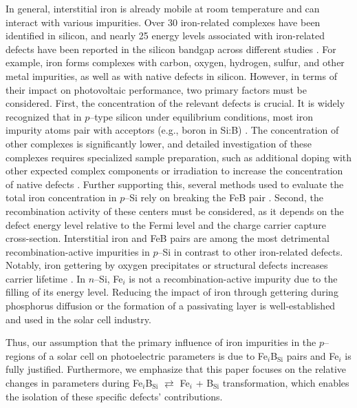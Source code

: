 \documentclass[a4paper,fleqn]{cas-sc}
\begin{document}
In general, interstitial iron is already mobile at room temperature and can interact with various impurities. 
Over 30 iron-related complexes have been identified in silicon, 
and nearly 25 energy levels associated with iron-related defects have been reported in the silicon bandgap across different studies \cite{Istratov1999,Gwozdz2022,JYOTHI2015}. 
For example, iron forms complexes with carbon, oxygen, hydrogen, sulfur, and other metal impurities, as well as with native defects in silicon. 
However, in terms of their impact on photovoltaic performance, two primary factors must be considered.
First, the concentration of the relevant defects is crucial. 
It is widely recognized that in $p$--type silicon under equilibrium conditions, most iron impurity atoms pair with acceptors 
(e.g., boron in Si:B) \cite{Kimerling1983,Istratov1999}. 
The concentration of other complexes is significantly lower, 
and detailed investigation of these complexes requires specialized sample preparation, 
such as additional doping with other expected complex components 
or irradiation to increase the concentration of native defects \cite{Tang2013}. 
Further supporting this, several methods used to evaluate the total iron concentration in $p$--Si rely on breaking the FeB pair \cite{Zoth1990,FeMethod2012,Olikh2021JAP}.
Second, the recombination activity of these centers must be considered, 
as it depends on the defect energy level relative to the Fermi level and the charge carrier capture cross-section.
Interstitial iron and FeB pairs are among the most detrimental recombination-active impurities in $p$--Si \cite{Istratov1999,TeimurazJAP} in contrast to other iron-related defects.
Notably, iron gettering by oxygen precipitates or structural defects increases carrier lifetime \cite{Schoen2011,FeB:Vahanissi}. 
In $n$--Si, Fe$_i$ is not a recombination-active impurity due to the filling of its energy level. 
Reducing the impact of iron through gettering during phosphorus diffusion \cite{Schoen2011,FeB:Vahanissi,Vaehaenissi2017} or the formation of a 
passivating layer \cite{Teimuraz2014JAP} is well-established and used in the solar cell industry.

Thus, our assumption that the primary influence of iron impurities in the $p$--regions of a solar cell on photoelectric parameters is due to 
Fe$_i$B$_\mathrm{Si}$ pairs and Fe$_i$ is fully justified. 
Furthermore, we emphasize that this paper focuses on the relative changes in parameters during 
Fe$_i$B$_\mathrm{Si}$ $\rightleftarrows$ Fe$_i$ + B$_\mathrm{Si}$ transformation, which enables the isolation of these specific defects' contributions.
\end{document}
